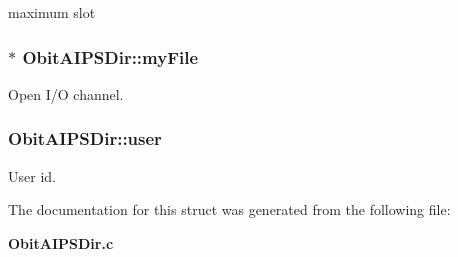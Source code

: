 maximum slot 

\subsubsection{$\ast$ {\bf Obit\-AIPSDir::my\-File}}\label{structObitAIPSDir_o1}


Open I/O channel. 

\subsubsection{ {\bf Obit\-AIPSDir::user}}\label{structObitAIPSDir_o4}


User id. 



The documentation for this struct was generated from the following file:\begin{CompactItemize}
\item 
{\bf Obit\-AIPSDir.c}\end{CompactItemize}
